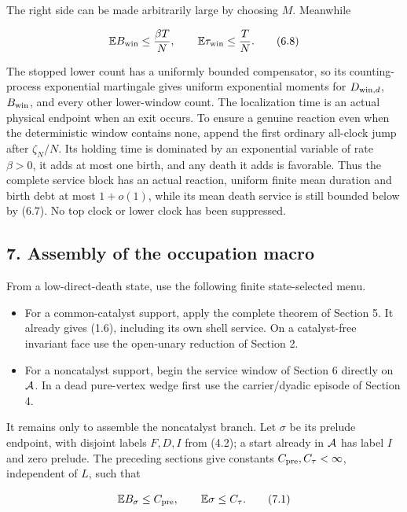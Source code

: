 The right side can be made arbitrarily large by choosing \(M\).
Meanwhile

\[
       \mathbb E B_{\rm win}\le\frac{\beta T}{N},
 \qquad \mathbb E\tau_{\rm win}\le \frac{T}{N}.     \tag{6.8}
\]

The stopped lower count has a uniformly bounded compensator, so its
counting-process exponential martingale gives uniform exponential
moments for \(D_{{\rm win},d}\), \(B_{\rm win}\), and every other
lower-window count. The localization time is an actual physical endpoint
when an exit occurs. To ensure a genuine reaction even when the
deterministic window contains none, append the first ordinary all-clock
jump after \(\zeta_N/N\). Its holding time is dominated by an
exponential variable of rate \(\beta>0\), it adds at most one birth, and
any death it adds is favorable. Thus the complete service block has an
actual reaction, uniform finite mean duration and birth debt at most
\(1+o(1)\), while its mean death service is still bounded below by
(6.7). No top clock or lower clock has been suppressed.

\subsection{7. Assembly of the occupation
macro}

From a low-direct-death state, use the following finite state-selected
menu.

\begin{itemize}
\tightlist
\item
  For a common-catalyst support, apply the complete theorem of Section
  5. It already gives (1.6), including its own shell service. On a
  catalyst-free invariant face use the open-unary reduction of Section
  2.
\item
  For a noncatalyst support, begin the service window of Section 6
  directly on \({\cal A}\). In a dead pure-vertex wedge first use the
  carrier/dyadic episode of Section 4.
\end{itemize}

It remains only to assemble the noncatalyst branch. Let \(\sigma\) be
its prelude endpoint, with disjoint labels \(F,D,I\) from (4.2); a start
already in \({\cal A}\) has label \(I\) and zero prelude. The preceding
sections give constants \(C_{\rm pre},C_\tau<\infty\), independent of
\(L\), such that

\[
 \mathbb E B_\sigma\le C_{\rm pre},\qquad
 \mathbb E\sigma\le C_\tau.                          \tag{7.1}
\]

